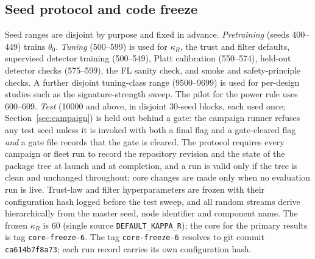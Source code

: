 \documentclass[journal]{IEEEtran}
\begin{document}
\subsection{Seed protocol and code freeze}
\label{sec:seeds}
Seed ranges are disjoint by purpose and fixed in advance.
\emph{Pretraining} (seeds 400--449) trains $\theta_0$.
\emph{Tuning} (500--599) is used for $\kappa_R$, the trust and filter defaults, supervised detector training
(500--549), Platt calibration (550--574), held-out detector checks (575--599), the FL sanity check, and
smoke and safety-principle checks.
A further disjoint tuning-class range (9500--9699) is used for per-design studies such as the
signature-strength sweep. The pilot for the power rule uses 600--609.
\emph{Test} (10000 and above, in disjoint $30$-seed blocks, each used once; Section~\ref{sec:campaign}) is held out behind a gate: the campaign
runner refuses any test seed unless it is invoked with both a final flag and a gate-cleared flag \emph{and}
a gate file records that the gate is cleared. The protocol requires every campaign or fleet run to record the repository revision and the state of the package tree at
launch and at completion, and a run is valid only if the tree is clean and unchanged throughout; core
changes are made only when no evaluation run is live. Trust-law and filter hyperparameters are frozen with
their configuration hash logged before the test sweep, and all random streams derive hierarchically from
the master seed, node identifier and component name. The frozen $\kappa_R$ is $60$ (single source \texttt{DEFAULT\_KAPPA\_R}); the core for the primary results is tag \texttt{core-freeze-6}.
The tag \texttt{core-freeze-6} resolves to git commit \texttt{ca614b7f8a73}; each run record carries its own configuration hash.

\end{document}
